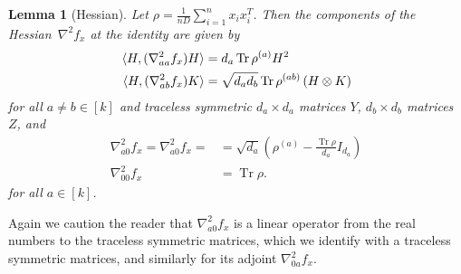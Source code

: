 \documentclass[aos]{imsart}
\newtheorem{lemma}[theorem]{Lemma}
\theoremstyle{definition}
\numberwithin{equation}{section}
\DeclareMathOperator{\tr}{Tr}
\newcommand{\ot}{\otimes}
\newcommand{\samp}{x}
\begin{document}
\begin{lemma}[Hessian]\label{lem:hessian}
Let $\rho = \frac{1}{nD}\sum_{i=1}^n \samp_i \samp_i^T$.
Then the components of the Hessian~$\nabla^2 f_{\samp}$ at the identity are given by
\begin{align*}
  \braket{H, (\nabla^2_{aa} f_x) H} &= d_a \tr \rho^{(a)} H^2 \\
  \braket{H, (\nabla^2_{ab} f_x) K} &= \sqrt{d_a d_b} \tr \rho^{(ab)} \left( H \ot K \right)
\end{align*}
for all $a\neq b\in[k]$ and traceless symmetric $d_a\times d_a$ matrices $Y$, $d_b\times d_b$ matrices~$Z$, and
\begin{align*}
  \nabla^2_{a0} f_x = \nabla^2_{a0} f_x = & =  \sqrt{d_a} \left( \rho^{(a)} - \frac{\tr \rho}{d_a} I_{d_a} \right) \\
  \nabla^2_{00} f_x &= \tr \rho.
\end{align*}
for all $a \in [k]$.
\end{lemma}
Again we caution the reader that $\nabla^2_{a0} f_x$ is a linear operator from the real numbers to the traceless symmetric matrices, which we identify with a traceless symmetric matrices, and similarly for its adjoint $\nabla^2_{0a} f_x$.
\end{document}
